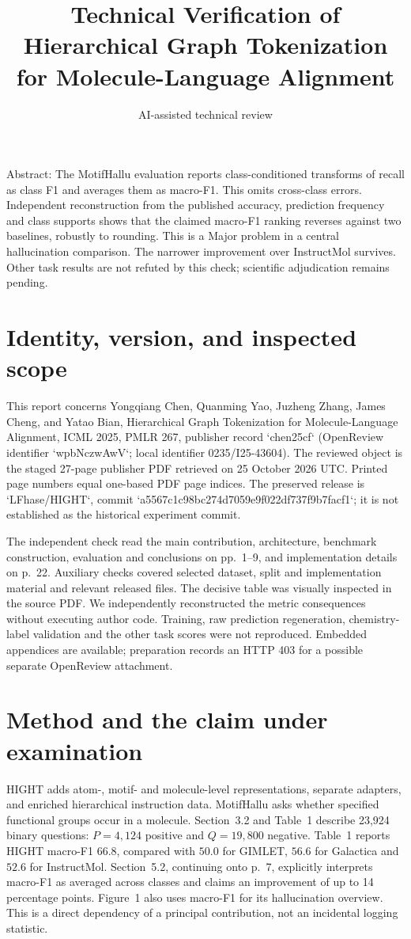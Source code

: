 \documentclass[10pt]{article}
\title{Technical Verification of
Hierarchical Graph Tokenization for Molecule-Language Alignment}
\author{AI-assisted technical review}
\date{}
\begin{document}
\maketitle
Abstract: The MotifHallu evaluation reports class-conditioned transforms of recall as class F1 and averages them as macro-F1. This omits cross-class errors. Independent reconstruction from the published accuracy, prediction frequency and class supports shows that the claimed macro-F1 ranking reverses against two baselines, robustly to rounding. This is a Major problem in a central hallucination comparison. The narrower improvement over InstructMol survives. Other task results are not refuted by this check; scientific adjudication remains pending.\par
\section*{Identity, version, and inspected scope}
This report concerns Yongqiang Chen, Quanming Yao, Juzheng Zhang, James Cheng, and Yatao Bian, Hierarchical Graph Tokenization for Molecule-Language Alignment, ICML 2025, PMLR 267, publisher record `chen25cf` (OpenReview identifier `wpbNczwAwV`; local identifier 0235/I25-43604). The reviewed object is the staged 27-page publisher PDF retrieved on 25 October 2026 UTC. Printed page numbers equal one-based PDF page indices. The preserved release is `LFhase/HIGHT`, commit `a5567c1c98bc274d7059e9f022df737f9b7facf1`; it is not established as the historical experiment commit.\par
The independent check read the main contribution, architecture, benchmark construction, evaluation and conclusions on pp. 1–9, and implementation details on p. 22. Auxiliary checks covered selected dataset, split and implementation material and relevant released files. The decisive table was visually inspected in the source PDF. We independently reconstructed the metric consequences without executing author code. Training, raw prediction regeneration, chemistry-label validation and the other task scores were not reproduced. Embedded appendices are available; preparation records an HTTP 403 for a possible separate OpenReview attachment.\par
\section*{Method and the claim under examination}
HIGHT adds atom-, motif- and molecule-level representations, separate adapters, and enriched hierarchical instruction data. MotifHallu asks whether specified functional groups occur in a molecule. Section 3.2 and Table 1 describe 23,924 binary questions: \(P=4,124\) positive and \(Q=19,800\) negative. Table 1 reports HIGHT macro-F1 \(66.8\), compared with \(50.0\) for GIMLET, \(56.6\) for Galactica and \(52.6\) for InstructMol. Section 5.2, continuing onto p. 7, explicitly interprets macro-F1 as averaged across classes and claims an improvement of up to 14 percentage points. Figure 1 also uses macro-F1 for its hallucination overview. This is a direct dependency of a principal contribution, not an incidental logging statistic.\par
\end{document}
